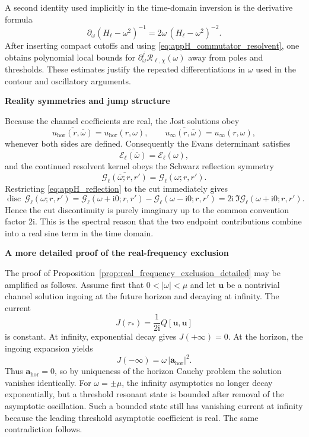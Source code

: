 \documentclass[12pt]{article}
\numberwithin{equation}{section}
\theoremstyle{plain}
\theoremstyle{definition}
\theoremstyle{remark}
\newcommand{\ii}{\mathrm i}
\newcommand{\disc}{\operatorname{disc}}
\newcommand{\hor}{\mathrm{hor}}
\newcommand{\cG}{\mathcal G}
\newcommand{\cR}{\mathcal R}
\newcommand{\cE}{\mathcal E}
\newcommand{\om}{\omega}
\newcommand{\abs}[1]{\left|#1\right|}
\newcommand{\appheading}[1]{\par\medskip\noindent\textbf{#1}\par\smallskip\noindent}
\begin{document}
A second identity used implicitly in the time-domain inversion is the derivative formula
\begin{equation}\label{eq:appH_resolvent_derivative}
   \partial_\om (H_\ell-\om^2)^{-1}
   =
   2\om\,(H_\ell-\om^2)^{-2}.
\end{equation}
After inserting compact cutoffs and using \eqref{eq:appH_commutator_resolvent}, one obtains polynomial local bounds for $\partial_\om^j\cR_{\ell,\chi}(\om)$ away from poles and thresholds.  These estimates justify the repeated differentiations in $\om$ used in the contour and oscillatory arguments.

\appheading{Reality symmetries and jump structure}

Because the channel coefficients are real, the Jost solutions obey
\[
   \overline{u_{\hor}(r,\bar\om)}=u_{\hor}(r,\om),
   \qquad
   \overline{u_{\infty}(r,\bar\om)}=u_{\infty}(r,\om),
\]
whenever both sides are defined.  Consequently the Evans determinant satisfies
\[
   \overline{\cE_\ell(\bar\om)}=\cE_\ell(\om),
\]
and the continued resolvent kernel obeys the Schwarz reflection symmetry
\begin{equation}\label{eq:appH_reflection}
   \overline{\cG_\ell(\bar\om;r,r')}=\cG_\ell(\om;r,r').
\end{equation}
Restricting \eqref{eq:appH_reflection} to the cut immediately gives
\[
   \disc\,\cG_\ell(\om;r,r')
   =
   \cG_\ell(\om+\ii0;r,r')-\cG_\ell(\om-\ii0;r,r')
   =
   2\ii\,\Im\cG_\ell(\om+\ii0;r,r').
\]
Hence the cut discontinuity is purely imaginary up to the common convention factor $2\ii$.  This is the spectral reason that the two endpoint contributions combine into a real sine term in the time domain.

\appheading{A more detailed proof of the real-frequency exclusion}

The proof of Proposition~\ref{prop:real_frequency_exclusion_detailed} may be amplified as follows.  Assume first that $0<\abs{\om}<\mu$ and let $\bm u$ be a nontrivial channel solution ingoing at the future horizon and decaying at infinity.  The current
\[
   J(r_*)=\frac{1}{2\ii}Q[\bm u,\bm u]
\]
is constant.  At infinity, exponential decay gives $J(+\infty)=0$.  At the horizon, the ingoing expansion yields
\[
   J(-\infty)=\om\,\abs{\bm a_{\hor}}^2.
\]
Thus $\bm a_{\hor}=0$, so by uniqueness of the horizon Cauchy problem the solution vanishes identically.  For $\om=\pm\mu$, the infinity asymptotics no longer decay exponentially, but a threshold resonant state is bounded after removal of the asymptotic oscillation.  Such a bounded state still has vanishing current at infinity because the leading threshold asymptotic coefficient is real.  The same contradiction follows.
\end{document}
